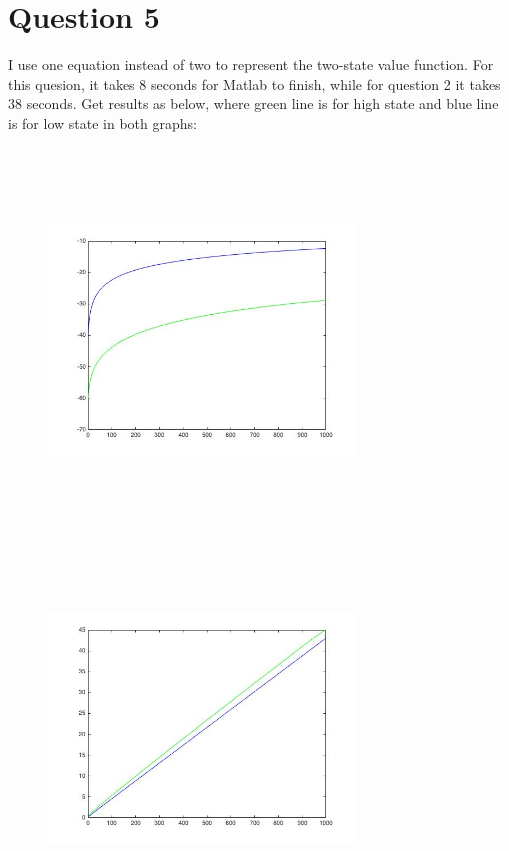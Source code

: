 \documentclass[12pt]{article}
\begin{document}
	\section{Question 5}
	I use one equation instead of two to represent the two-state value function. For this quesion, it takes 8 seconds for Matlab to finish, while for question 2 it takes 38 seconds. Get results as below, where green line is for high state and blue line is for low state in both graphs:
	\begin{figure}[!h]\centering
		\includegraphics[width=3.2in,height=4in]{vfn_q5}
		\includegraphics[width=3.2in,height=4in]{pl_q5}
	\end{figure}
\end{document}
